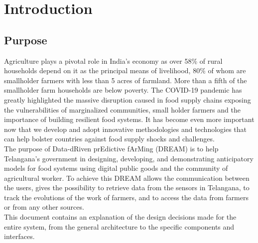 \section{Introduction}
\subsection{Purpose}
Agriculture plays a pivotal role in India’s economy as over 58\% of rural households depend on it as the principal means of livelihood, 80\% of whom are smallholder farmers with less than 5 acres of farmland. More than a fifth of the smallholder farm households are below poverty. The COVID-19 pandemic has greatly highlighted the massive disruption caused in food supply chains exposing the vulnerabilities of marginalized communities, small holder farmers and the importance of building resilient food systems. It has become even more important now that we develop and adopt innovative methodologies and technologies that can help bolster countries against food supply shocks and challenges.\\
The purpose of Data-dRiven prEdictive fArMing (DREAM) is to help Telangana’s government in designing, developing, and demonstrating anticipatory models for food systems using digital public goods and the community of agricultural worker. To achieve this DREAM allows the communication between the users, gives the possibility to retrieve data from the sensors in Telangana, to track the evolutions of the work of farmers, and to access the data from farmers or from any other sources.\\
This document contains an explanation of the design decisions made for the entire system, from the general architecture to the specific components and interfaces.

